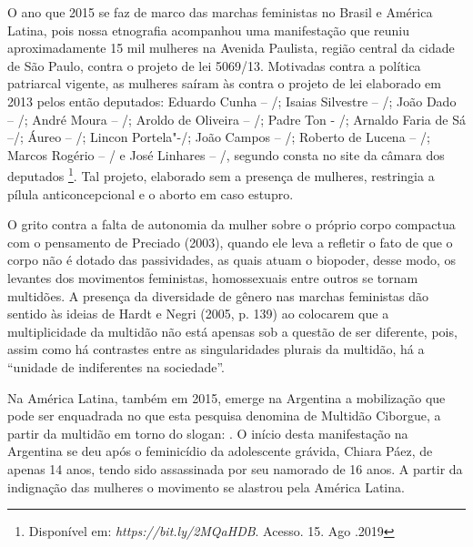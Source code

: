 O ano que 2015 se faz de marco das marchas feministas no Brasil e
América Latina, pois nossa etnografia acompanhou uma manifestação que
reuniu aproximadamente 15 mil mulheres na Avenida Paulista, região
central da cidade de São Paulo, contra o projeto de lei 5069/13.
Motivadas contra a política patriarcal vigente, as mulheres saíram às
contra o projeto de lei elaborado em 2013 pelos então deputados:
Eduardo Cunha --
/; Isaias
Silvestre -- /;
João Dado -- /;
André Moura -- /;
Aroldo de Oliveira -- /;
Padre Ton - /;
Arnaldo Faria de Sá --/; Áureo -- /; Lincon Portela"-/;
João Campos -- /; Roberto de Lucena -- /; Marcos Rogério --
/ e José Linhares -- /, segundo consta no site da câmara dos
deputados \footnote{Disponível em:
  \emph{https://bit.ly/2MQaHDB}.
  Acesso. 15. Ago .2019}. Tal projeto, elaborado sem a presença de
mulheres, restringia a pílula anticoncepcional e o aborto em caso
estupro.

O grito contra a falta de autonomia da mulher sobre o próprio corpo
compactua com o pensamento de Preciado (2003), quando ele leva a
refletir o fato de que o corpo não é dotado das passividades, as quais
atuam o biopoder, desse modo, os levantes dos movimentos feministas,
homossexuais entre outros se tornam multidões. A presença da diversidade
de gênero nas marchas feministas dão sentido às ideias de Hardt e Negri
(2005, p. 139) ao colocarem que a multiplicidade da multidão não está
apensas sob a questão de ser diferente, pois, assim como há contrastes
entre as singularidades plurais da multidão, há a ``unidade de
indiferentes na sociedade''.

Na América Latina, também em 2015, emerge na Argentina a mobilização que
pode ser enquadrada no que esta pesquisa denomina de Multidão Ciborgue,
a partir da multidão em torno do slogan: . O início desta
manifestação na Argentina se deu após o feminicídio da adolescente
grávida, Chiara Páez, de apenas 14 anos, tendo sido assassinada por seu
namorado de 16 anos. A partir da indignação das mulheres o movimento se
alastrou pela América Latina.


